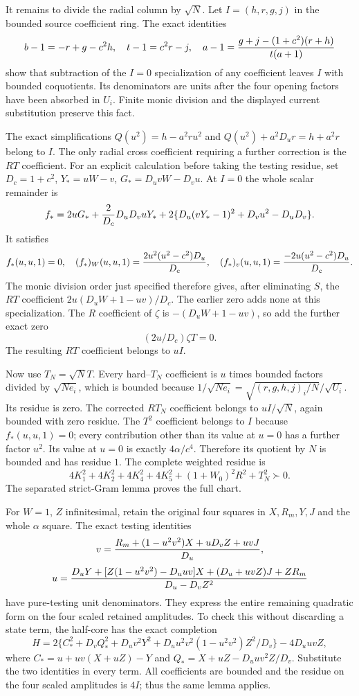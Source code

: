 It remains to divide the radial column by $\sqrt N$. Let
$I=(h,r,g,j)$ in the bounded source coefficient ring. The exact
identities
\[
 b-1=-r+g-c^2h,\quad t-1=c^2r-j,\quad
 a-1={g+j-(1+c^2)(r+h)\over t(a+1)}
\]
show that subtraction of the $I=0$ specialization of any coefficient
leaves $I$ with bounded coquotients. Its denominators are units after
the four opening factors have been absorbed in $U_i$. Finite monic
division and the displayed current substitution preserve this fact.

The exact simplifications $Q(u^2)=h-a^2ru^2$ and
$Q(u^2)+a^2D_ur=h+a^2r$ belong to $I$. The only radial cross
coefficient requiring a further correction is the $RT$ coefficient.
For an explicit calculation before taking the testing residue, set
$D_c=1+c^2$, $Y_*=uW-v$, $G_*=D_uvW-D_vu$. At $I=0$ the whole
scalar remainder is
\[
 f_*=2uG_*+{2\over D_c}D_uD_vuY_*
       +2\{D_u(vY_*-1)^2+D_vu^2-D_uD_v\}.
\]
It satisfies
\[
 f_*(u,u,1)=0,\quad
 (f_*)_W(u,u,1)={2u^2(u^2-c^2)D_u\over D_c},\quad
 (f_*)_v(u,u,1)={-2u(u^2-c^2)D_u\over D_c}.
\]
The monic division order just specified therefore gives, after
eliminating $S$, the $RT$ coefficient
$2u(D_uW+1-uv)/D_c$. The earlier zero adds none at this
specialization. The $R$ coefficient of $\zeta$ is
$-(D_uW+1-uv)$, so add the further exact zero
\[
                         (2u/D_c)\zeta T=0.
\]
The resulting $RT$ coefficient belongs to $uI$.

Now use $T_N=\sqrt N T$. Every hard--$T_N$ coefficient is $u$
times bounded factors divided by $\sqrt{Ne_i}$, which is bounded
because $1/\sqrt{Ne_i}=\sqrt{(r,g,h,j)_i/N}/\sqrt{U_i}$.
Its residue is zero. The corrected $RT_N$ coefficient belongs to
$uI/\sqrt N$, again bounded with zero residue. The $T^2$ coefficient
belongs to $I$ because $f_*(u,u,1)=0$; every contribution other than
its value at $u=0$ has a further factor $u^2$. Its value at $u=0$ is
exactly $4\alpha/c^4$. Therefore its quotient by $N$ is bounded and
has residue $1$. The complete weighted residue is
\[
 4K_1^2+4K_2^2+4K_4^2+4K_5^2+(1+W_0)^2R^2+T_N^2\succ0.
\]
The separated strict-Gram lemma proves the full chart.

For $W=1$, $Z$ infinitesimal, retain the original four squares in
$X,R_m,Y,J$ and the whole $\alpha$ square. The exact testing identities
\[
 v={R_m+(1-u^2v^2)X+uD_vZ+uvJ\over D_u},
\]
\[
 u={D_uY+[Z(1-u^2v^2)-D_uuv]X+(D_u+uvZ)J+ZR_m
       \over D_u-D_vZ^2}
\]
have pure-testing unit denominators. They express the entire remaining
quadratic form on the four scaled retained amplitudes. To check this
without discarding a state term, the half-core has the exact completion
\[
 H=2\{C_*^2+D_vQ_*^2+D_uv^2Y^2
       +D_uu^2v^2(1-u^2v^2)Z^2/D_v\}-4D_uuvZ,
\]
where $C_*=u+uv(X+uZ)-Y$ and
$Q_*=X+uZ-D_uuv^2Z/D_v$. Substitute the two identities in every
term. All coefficients are bounded and the residue on the four scaled
amplitudes is $4I$; thus the same lemma applies.

